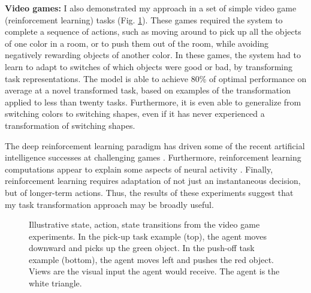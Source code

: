 \documentclass[12pt]{article}
\begin{document}
\textbf{Video games:} I also demonstrated my approach in a set of simple video game (reinforcement learning) tasks (Fig. \ref{fig:extending_grid_task_views}). These games required the system to complete a sequence of actions, such as moving around to pick up all the objects of one color in a room, or to push them out of the room, while avoiding negatively rewarding objects of another color. In these games, the system had to learn to adapt to switches of which objects were good or bad, by transforming task representations. The model is able to achieve 80\% of optimal performance on average at a novel transformed task, based on examples of the transformation applied to less than twenty tasks. Furthermore, it is even able to generalize from switching colors to switching shapes, even if it has never experienced a transformation of switching shapes. 

The deep reinforcement learning paradigm has driven some of the recent artificial intelligence successes at challenging games \citep{Silver2017,Vinyals2019}. Furthermore, reinforcement learning computations appear to explain some aspects of neural activity \citep{Dabney2020}. Finally, reinforcement learning requires adaptation of not just an instantaneous decision, but of longer-term actions. Thus, the results of these experiments suggest that my task transformation approach may be broadly useful.

\begin{figure}[h]
\singlespacing
\centering
{}
\caption[Illustrative state transitions from the RL grid experiments.]{Illustrative state, action, state transitions from the video game experiments. In the pick-up task example (top), the agent moves downward and picks up the green object. In the push-off task example (bottom), the agent moves left and pushes the red object. Views are the visual input the agent would receive. The agent is the white triangle.} \label{fig:extending_grid_task_views}
\end{figure}
\end{document}
